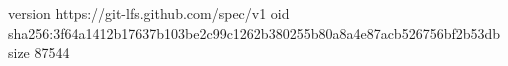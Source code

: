 version https://git-lfs.github.com/spec/v1
oid sha256:3f64a1412b17637b103be2c99c1262b380255b80a8a4e87acb526756bf2b53db
size 87544
